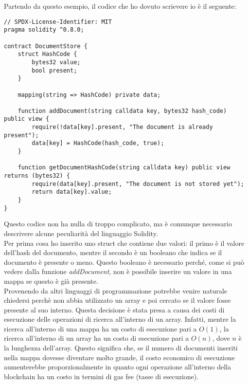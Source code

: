 Partendo da questo esempio, il codice che ho dovuto scrievere io è il seguente:
\begin{lstlisting}[language=Solidity]
// SPDX-License-Identifier: MIT
pragma solidity ^0.8.0;

contract DocumentStore {
    struct HashCode {
        bytes32 value;
        bool present;
    }

    mapping(string => HashCode) private data;

    function addDocument(string calldata key, bytes32 hash_code) public view {
        require(!data[key].present, "The document is already present");
        data[key] = HashCode(hash_code, true);
    }

    function getDocumentHashCode(string calldata key) public view returns (bytes32) {
        require(data[key].present, "The document is not stored yet");
        return data[key].value;
    }
}
\end{lstlisting}

Questo codice non ha nulla di troppo complicato, ma è comunque necessario
descrivere alcune peculiarità del linguaggio Solidity.\\
Per prima cosa ho inserito uno struct che contiene due valori: il primo è il
valore dell'hash del documento, mentre il secondo è un booleano che indica se
il documento è presente o meno. Questo booleano è necessario perché, come si
può vedere dalla funzione \textit{addDocument}, non è possibile inserire un
valore in una mappa se questo è già presente. \\
Provenendo da altri linguaggi di programmazione potrebbe venire naturale
chiedersi perchè non abbia utilizzato un array e poi cercato se il valore fosse
presente al suo interno. Questa decisione è stata presa a causa dei costi di
esecuzione delle operazioni di ricerca all'interno di un array. Infatti, mentre
la ricerca all'interno di una mappa ha un costo di esecuzione pari a $O(1)$, la
ricerca all'interno di un array ha un costo di esecuzione pari a $O(n)$, dove
$n$ è la lunghezza dell'array. Questo significa che, se il numero di documenti
inseriti nella mappa dovesse diventare molto grande, il costo economico di 
esecuzione aumenterebbe proporzionalmente in quanto ogni operazione all'interno
della blockchain ha un costo in termini di gas fee (tasse di esecuzione).

